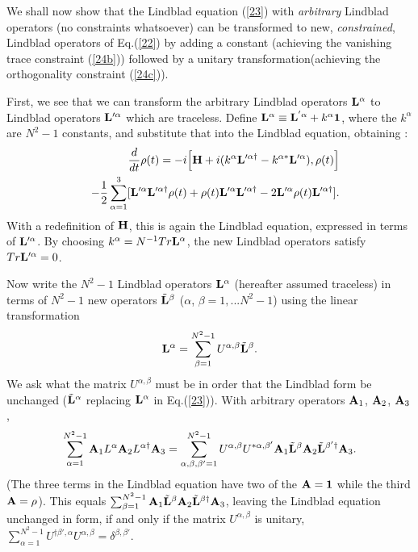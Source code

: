 \documentclass[aps,pra,amssymb, amsfonts,amsmath,showpacs, superscriptaddress,12pt]{revtex4}
\begin{document}
 We shall now show that the Lindblad equation (\ref{23}) with \textit{arbitrary} Lindblad operators (no constraints whatsoever)  can be transformed to new, \textit{constrained},  Lindblad operators of Eq.(\ref{22}) by adding a constant (achieving the vanishing trace constraint  (\ref{24b})) followed by a unitary transformation(achieving the orthogonality constraint  (\ref{24c})).
 
 
First, we see that we can transform the arbitrary Lindblad operators ${\bf L}^{\alpha}$ to Lindblad operators ${\bf L}'^{\alpha}$ which are traceless.   Define ${\bf L}^{\alpha}\equiv{\bf L}^{'\alpha}+k^{\alpha}{\bf 1}$, where the $k^{\alpha}$ are $N^{2}-1$ constants,  and substitute that into the Lindblad equation, obtaining :
 \begin{eqnarray}
&&\frac{d}{dt}{\bf\rho}(t)=-i\Big[{\bf H}+i(k^{\alpha}{\bf L}'^{\alpha\dagger}-k^{\alpha*}{\bf L}'^{\alpha}), {\bf\rho}(t)\Big]\nonumber\\
&&-\frac{1}{2}\sum_{\alpha=1}^{3}[{\bf L}'^{\alpha}{\bf L}'^{\alpha\dagger} {\bf\rho}(t)+ {\bf\rho}(t){\bf L}'^{\alpha}{\bf L}'^{\alpha\dagger}-2{\bf L}'^{\alpha}{\bf\rho}(t){\bf L}'^{\alpha\dagger}].\nonumber
 \end{eqnarray}
\noindent With a redefinition of ${\bf H}$, this is again the Lindblad equation, expressed in terms of ${\bf L}'^{\alpha}$. By choosing $k^{\alpha}=N^{-1}Tr{\bf L}^{\alpha}$, the new Lindblad operators satisfy $Tr{\bf L}'^{\alpha}=0$.  

Now write the $N^{2}-1$ Lindblad operators ${\bf L}^{\alpha}$  (hereafter assumed traceless) in terms of $N^{2}-1$ new operators $\tilde{\bf L}^{\beta}$ ($\alpha$, $\beta =1,... N^{2}-1$) using the linear transformation
\begin{equation}\label{25}
{\bf L}^{\alpha}=\sum_{\beta=1}^{N^{2}-1}U^{\alpha, \beta}\tilde{\bf L}^{\beta}.
\end{equation}
\noindent We ask what the matrix $U^{\alpha, \beta}$ must be in order that the Lindblad form be unchanged ($\tilde{\bf L}^{\alpha}$ replacing ${\bf L}^{\alpha}$  
in Eq.(\ref{23})).  With arbitrary  operators ${\bf A}_{1}$, ${\bf A}_{2}$, ${\bf A}_{3}$,  
\[
\sum_{\alpha=1}^{N^{2}-1}{\bf A}_{1}L^{\alpha}{\bf A}_{2}L^{\alpha\dagger}{\bf A}_{3}=\sum_{\alpha,\beta, \beta'=1}^{N^{2}-1}U^{\alpha, \beta}U^{*\alpha, \beta'}{\bf A}_{1}\tilde{\bf L}^{\beta}{\bf A}_{2}
\tilde{\bf  L}^{\beta'\dagger}{\bf A}_{3}.
\]
\noindent (The three terms in the Lindblad equation have two of the ${\bf A}={\bf 1}$ while the third  ${\bf A}={\bf \rho}$).  This  equals $\sum_{\beta=1}^{N^{2}-1}{\bf A}_{1}\tilde{\bf L}^{\beta}{\bf A}_{2}\tilde{\bf L}^{\beta\dagger}{\bf A}_{3}$, leaving  
the Lindblad equation unchanged in form, if and only if the  matrix $U^{\alpha, \beta}$ is unitary, $\sum_{\alpha=1}^{N^{2}-1}U^{\dagger\beta', \alpha}U^{\alpha, \beta}=\delta^{\beta,\beta'}$.
\end{document}

